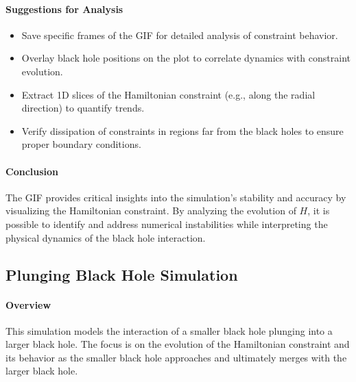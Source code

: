 \documentclass[12pt]{article}
\begin{document}
\paragraph{Suggestions for Analysis}
\begin{itemize}
    \item Save specific frames of the GIF for detailed analysis of constraint behavior.
    \item Overlay black hole positions on the plot to correlate dynamics with constraint evolution.
    \item Extract 1D slices of the Hamiltonian constraint (e.g., along the radial direction) to quantify trends.
    \item Verify dissipation of constraints in regions far from the black holes to ensure proper boundary conditions.
\end{itemize}

\paragraph{Conclusion}
The GIF provides critical insights into the simulation's stability and accuracy by visualizing the Hamiltonian constraint. By analyzing the evolution of \( H \), it is possible to identify and address numerical instabilities while interpreting the physical dynamics of the black hole interaction.

\subsection{Plunging Black Hole Simulation}

\paragraph{Overview}
This simulation models the interaction of a smaller black hole plunging into a larger black hole. The focus is on the evolution of the Hamiltonian constraint and its behavior as the smaller black hole approaches and ultimately merges with the larger black hole.
\end{document}
